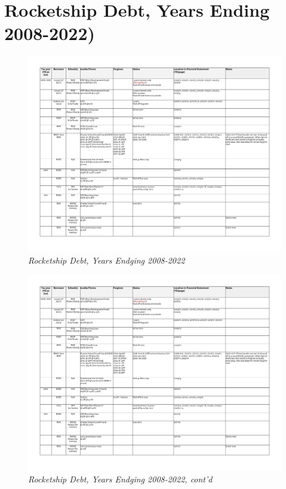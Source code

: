 
\chapter{Rocketship Debt, Years Ending 2008-2022)}\label{ch:debt_2010-22}

\begin{figure}
  \caption[Rocketship Debt, Years Ending 2008–2022]{\textit{Rocketship Debt, Years Endging 2008-2022}}%
  \label{fig:debt_2008-2022} %
  \includegraphics[page=1,width=\textheight]{Debt_2008-2022} %
\end{figure}

\begin{figure}
  \caption*{\textit{Rocketship Debt, Years Endging 2008-2022, cont'd}}
  \includegraphics[page=2,width=\textheight]{Debt_2008-2022} %
\end{figure}


